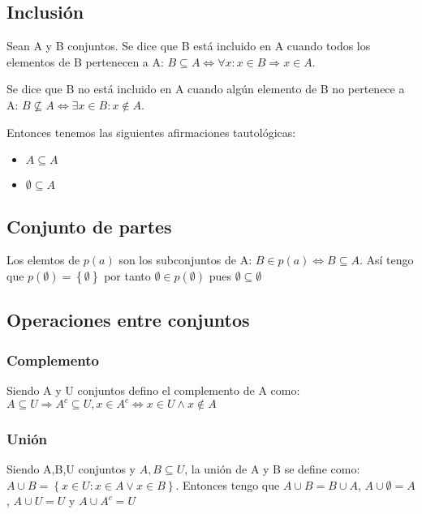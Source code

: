 \documentclass{report}
\begin{document}
\subsection{Inclusión}
Sean A y B conjuntos. Se dice que B está incluido en A cuando todos los elementos de B pertenecen a A: \begin{math}
    B \subseteq A \iff \forall x: x \in B \Rightarrow x \in A
\end{math}.

Se dice que B no está incluido en A cuando algún elemento de B no pertenece a A: \begin{math}
    B \nsubseteq A \iff \exists x \in B: x \notin A
\end{math}.

Entonces tenemos las siguientes afirmaciones tautológicas: \begin{itemize}
    \item \(A \subseteq A\) 
    \item \(\emptyset \subseteq A\)
\end{itemize}
\subsection{Conjunto de partes}
Los elemtos de $p(a)$ son los subconjuntos de A: \begin{math}
    B \in p(a) \iff B \subseteq A
\end{math}. Así tengo que 
    $p(\emptyset) = \left\{\emptyset \right\}$ por tanto $\emptyset \in p(\emptyset)$ pues $\emptyset \subseteq \emptyset$

\subsection{Operaciones entre conjuntos}
\subsubsection{Complemento}
Siendo A y U conjuntos defino el complemento de A como:
\begin{math}
    A \subseteq U \Rightarrow A^c \subseteq U, x \in A^c \iff x \in U \land x \notin A
\end{math}
\subsubsection{Unión}
Siendo A,B,U conjuntos y $A,B\subseteq U$, la unión de A y B se define como: \begin{math}
    A\cup B = \left\{x\in U: x\in A \lor x\in B\right\}
\end{math}. Entonces tengo que $A\cup B = B \cup A$, $A \cup \emptyset = A$, $A \cup U = U$ y $A \cup A^c = U$
\end{document}
